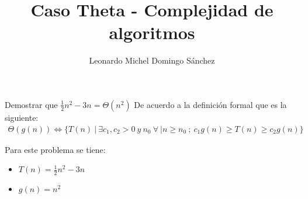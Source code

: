 \documentclass[11pt,letterpaper,fleqn]{article}
\title{Caso Theta - Complejidad de algoritmos}
\author{Leonardo Michel Domingo Sánchez}
\begin{document}
\maketitle
Demostrar que $ \frac{1}{2}n^{2} - 3n = \Theta(n^{2}) $ \smallbreak
De acuerdo a la definición formal que es la siguiente:
\begin{equation}
\begin{aligned}
	\Theta(g(n)) \Leftrightarrow \{ T(n) \ | \ \exists c_{1},c_{2} > 0 \ y \ n_{0} \ \forall \ | n \geq n_{0} \ ; \ c_{1} g(n) \geq T(n) \geq c_{2}g(n)\}
\end{aligned}
\end{equation}

Para este problema se tiene: 
\begin{itemize}
    \item $T(n) = \frac{1}{2} n^{2} - 3n$
    \item $ g(n) = n^{2} $
\end{itemize}
\end{document}
